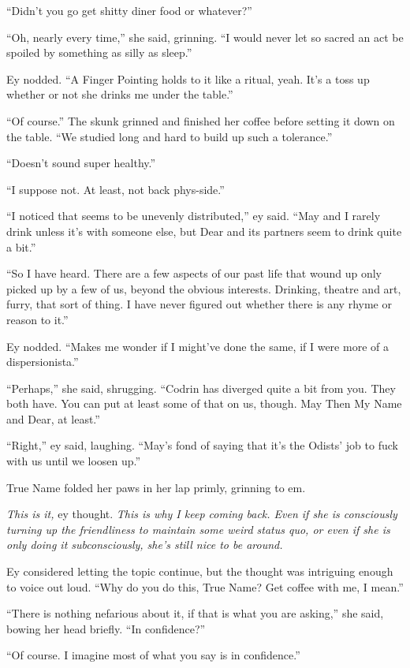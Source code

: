 ``Didn't you go get shitty diner food or whatever?''

``Oh, nearly every time,'' she said, grinning. ``I would never let so sacred an act be spoiled by something as silly as sleep.''

Ey nodded. ``A Finger Pointing holds to it like a ritual, yeah. It's a toss up whether or not she drinks me under the table.''

``Of course.'' The skunk grinned and finished her coffee before setting it down on the table. ``We studied long and hard to build up such a tolerance.''

``Doesn't sound super healthy.''

``I suppose not. At least, not back phys-side.''

``I noticed that seems to be unevenly distributed,'' ey said. ``May and I rarely drink unless it's with someone else, but Dear and its partners seem to drink quite a bit.''

``So I have heard. There are a few aspects of our past life that wound up only picked up by a few of us, beyond the obvious interests. Drinking, theatre and art, furry, that sort of thing. I have never figured out whether there is any rhyme or reason to it.''

Ey nodded. ``Makes me wonder if I might've done the same, if I were more of a dispersionista.''

``Perhaps,'' she said, shrugging. ``Codrin has diverged quite a bit from you. They both have. You can put at least some of that on us, though. May Then My Name and Dear, at least.''

``Right,'' ey said, laughing. ``May's fond of saying that it's the Odists' job to fuck with us until we loosen up.''

True Name folded her paws in her lap primly, grinning to em.

\emph{This is it,} ey thought. \emph{This is why I keep coming back. Even if she is consciously turning up the friendliness to maintain some weird status quo, or even if she is only doing it subconsciously, she's still nice to be around.}

Ey considered letting the topic continue, but the thought was intriguing enough to voice out loud. ``Why do you do this, True Name? Get coffee with me, I mean.''

``There is nothing nefarious about it, if that is what you are asking,'' she said, bowing her head briefly. ``In confidence?''

``Of course. I imagine most of what you say is in confidence.''

